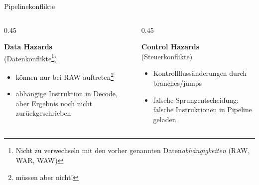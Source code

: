 \begin{frame}[c, fragile]{Pipelinekonflikte}{}
	\vspace{-0.5cm}
	\begin{columns}
		\begin{column}{0.45\textwidth}
			\begin{center}\textbf{Data Hazards}\\(Datenkonflikte\footnote[frame]{Nicht zu verwechseln mit den vorher genannten Daten\textit{abhängigkeiten} (RAW, WAR, WAW)})\end{center}
			\begin{itemize}
				\item können nur bei RAW auftreten\footnote[frame]{müssen aber nicht!}
				\item abhängige Instruktion in Decode, aber Ergebnis noch nicht zurückgeschrieben
			\end{itemize}
		\end{column}
		\begin{column}{0.45\textwidth}
			\begin{center}\textbf{Control Hazards}\\(Steuerkonflikte)\end{center}
			\begin{itemize}
				\item Kontrollflussänderungen durch branches/jumps
				\item falsche Sprungentscheidung: falsche Instruktionen in Pipeline geladen
			\end{itemize}
		\end{column}
	\end{columns}
\end{frame}

